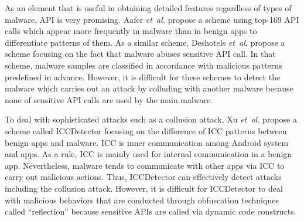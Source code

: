 \documentclass{ieeeaccess}
\newcommand{\etal}{\textit{et~al.}}
\begin{document}
As an element that is useful in obtaining detailed features regardless of types of malware, API is very promising.
Aafer \etal \cite{aafer2013droidapiminer} propose a scheme using top-169 API calls which appear more frequently in malware than in benign apps to differentiate patterns of them.
As a similar scheme, Deshotels \etal \cite{deshotels2014droidlegacy} propose a scheme focusing on the fact that malware abuses sensitive API call.
In that scheme, malware samples are classified in accordance with malicious patterns predefined in advance. 
However, it is difficult for these schemes to detect the malware which carries out an attack by colluding with another malware because none of sensitive API calls are used by the main malware.

To deal with sophisticated attacks such as a collusion attack, Xu \etal \cite{xu2016iccdetector} propose a scheme called ICCDetector focusing on the difference of ICC patterns between benign apps and malware.
ICC is inner communication among Android system and apps.
As a rule, ICC is mainly used for internal communication in a benign app.
Nevertheless, malware tends to communicate with other apps via ICC to carry out malicious actions.
Thus, ICCDetector can effectively detect attacks including the collusion attack.
However, it is difficult for ICCDetector to deal with malicious behaviors that are conducted through obfuscation techniques called ``reflection'' because sensitive APIs are called via dynamic code constructs.
\end{document}

